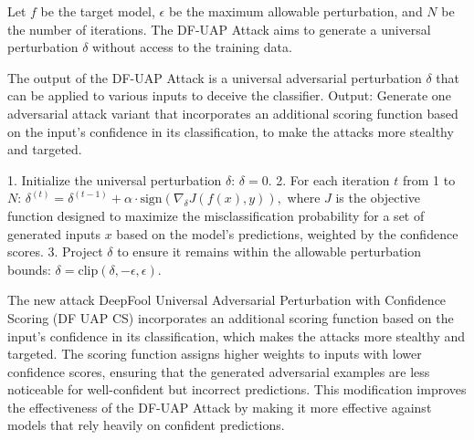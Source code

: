 Let \( f \) be the target model, \( \epsilon \) be the maximum allowable perturbation, and \( N \) be the number of iterations. The DF-UAP Attack aims to generate a universal perturbation \( \delta \) without access to the training data.

The output of the DF-UAP Attack is a universal adversarial perturbation \( \delta \) that can be applied to various inputs to deceive the classifier.
Output: Generate one adversarial attack variant that incorporates an additional scoring function based on the input's confidence in its classification, to make the attacks more stealthy and targeted.

1. Initialize the universal perturbation \( \delta \):
   $
   \delta = 0.
   $
2. For each iteration \( t \) from 1 to \( N \):
   $
   \delta^{(t)} = \delta^{(t-1)} + \alpha \cdot \text{sign} \left( \nabla_{\delta} J(f(x), y) \right),
   $
   where \( J \) is the objective function designed to maximize the misclassification probability for a set of generated inputs \( x \) based on the model's predictions, weighted by the confidence scores.
3. Project \( \delta \) to ensure it remains within the allowable perturbation bounds:
   $
   \delta = \text{clip}(\delta, -\epsilon, \epsilon).
   $

The new attack DeepFool Universal Adversarial Perturbation with Confidence Scoring (DF UAP CS) incorporates an additional scoring function based on the input's confidence in its classification, which makes the attacks more stealthy and targeted. The scoring function assigns higher weights to inputs with lower confidence scores, ensuring that the generated adversarial examples are less noticeable for well-confident but incorrect predictions. This modification improves the effectiveness of the DF-UAP Attack by making it more effective against models that rely heavily on confident predictions.